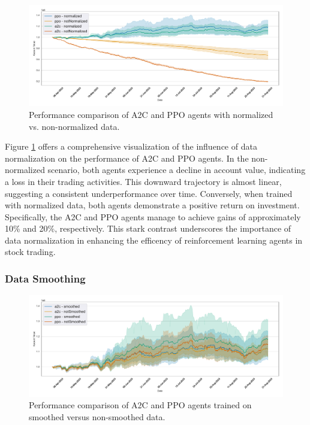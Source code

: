 \documentclass[12pt]{article}
\begin{document}
\begin{figure}[h]
\centering
\includegraphics[width=1\textwidth]{figs/Hyperparameter_tuning/Compare_agents_performance_normalized_ppo_a2c.pdf}
\caption{Performance comparison of A2C and PPO agents with normalized vs. non-normalized data.}
\label{fig:Compare_agents_performance_normalized_ppo_a2c}
\end{figure}

Figure \ref{fig:Compare_agents_performance_normalized_ppo_a2c} offers a comprehensive visualization of the influence of data normalization on the performance of A2C and PPO agents.
In the non-normalized scenario, both agents experience a decline in account value, indicating a loss in their trading activities. This downward trajectory is almost linear, suggesting a consistent underperformance over time. Conversely, when trained with normalized data, both agents demonstrate a positive return on investment. Specifically, the A2C and PPO agents manage to achieve gains of approximately 10\% and 20\%, respectively. This stark contrast underscores the importance of data normalization in enhancing the efficency of reinforcement learning agents in stock trading.


\subsubsection{Data Smoothing}

\begin{figure}[h]
    \centering
    \includegraphics[width=1\textwidth]{figs/Hyperparameter_tuning/Compare_agent_performance_smoothed_a2c_ppo.pdf}
    \caption{Performance comparison of A2C and PPO agents trained on smoothed versus non-smoothed data.}
    \label{fig:Compare_agent_performance_smoothed_a2c_ppo}
\end{figure}
\end{document}
